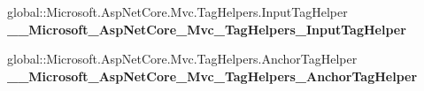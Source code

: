 \begin{DoxyCompactItemize}
\item 
\mbox{\label{class_asp_net_core_1_1_views___volunteers___delete_a0f7410f0ff3f3fbb1ae7e6c75be9f27e}} 
global\+::\+Microsoft.\+Asp\+Net\+Core.\+Mvc.\+Tag\+Helpers.\+Input\+Tag\+Helper {\bfseries \+\_\+\+\_\+\+Microsoft\+\_\+\+Asp\+Net\+Core\+\_\+\+Mvc\+\_\+\+Tag\+Helpers\+\_\+\+Input\+Tag\+Helper}
\item 
\mbox{\label{class_asp_net_core_1_1_views___volunteers___delete_a95003850a9e5348d244c37196a6588c0}} 
global\+::\+Microsoft.\+Asp\+Net\+Core.\+Mvc.\+Tag\+Helpers.\+Anchor\+Tag\+Helper {\bfseries \+\_\+\+\_\+\+Microsoft\+\_\+\+Asp\+Net\+Core\+\_\+\+Mvc\+\_\+\+Tag\+Helpers\+\_\+\+Anchor\+Tag\+Helper}
\end{DoxyCompactItemize}
